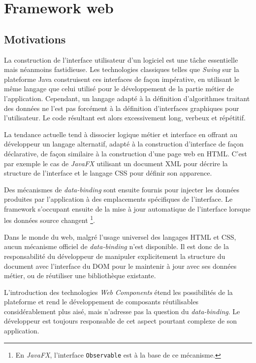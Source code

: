 \chapter{Framework web}

\section{Motivations}

La construction de l'interface utilisateur d'un logiciel est une tâche essentielle mais néanmoins fastidieuse. Les technologies classiques telles que \emph{Swing} sur la plateforme Java construisent ces interfaces de façon impérative, en utilisant le même langage que celui utilisé pour le développement de la partie métier de l'application. Cependant, un langage adapté à la définition d'algorithmes traitant des données ne l'est pas forcément à la définition d'interfaces graphiques pour l'utilisateur. Le code résultant est alors excessivement long, verbeux et répétitif.

La tendance actuelle tend à dissocier logique métier et interface en offrant au développeur un langage alternatif, adapté à la construction d'interface de façon déclarative, de façon similaire à la construction d'une page web en HTML. C'est par exemple le cas de \emph{JavaFX} utilisant un document XML pour décrire la structure de l'interface et le langage CSS pour définir son apparence.

Des mécanismes de \emph{data-binding} sont ensuite fournis pour injecter les données produites par l'application à des emplacements spécifiques de l'interface. Le framework s'occupant ensuite de la mise à jour automatique de l'interface lorsque les données source changent \footnote{En \emph{JavaFX}, l'interface \texttt{Observable} est à la base de ce mécanisme.}.

Dans le monde du web, malgré l'usage universel des langages HTML et CSS, aucun mécanisme officiel de \emph{data-binding} n'est disponible. Il est donc de la responsabilité du développeur de manipuler explicitement la structure du document avec l'interface du DOM pour le maintenir à jour avec ses données métier, ou de réutiliser une bibliothèque existante.

L'introduction des technologies \emph{Web Components} étend les possibilités de la plateforme et rend le développement de composants réutilisables considérablement plus aisé, mais n'adresse pas la question du \emph{data-binding}. Le développeur est toujours responsable de cet aspect pourtant complexe de son application.

